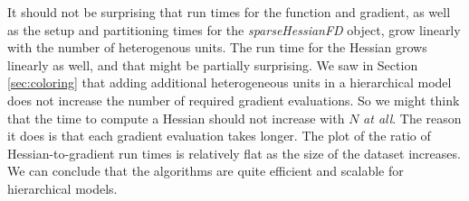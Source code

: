 \documentclass[article]{jss}\usepackage[]{graphicx}\usepackage[]{color}
\newcommand{\class}[1]{\textsl{#1}}
\begin{document}
It should not be surprising that run times
for the function and gradient, as well as the setup and
partitioning times for the \class{sparseHessianFD} object, grow
linearly with the number of heterogenous units.  The run time
for the Hessian grows linearly as well, and that might be partially
surprising.  We saw in Section \ref{sec:coloring} that adding
additional heterogeneous units in a hierarchical model does not
increase the number of required gradient evaluations.  So we might
think that the time
to compute a Hessian should not increase with $N$ \emph{at all}.  The
reason it does is that each gradient evaluation takes longer.  The
plot of the ratio of Hessian-to-gradient run times is relatively flat as the size
of the dataset increases.  We can conclude that the
 algorithms are quite efficient and scalable for
hierarchical models.





\FloatBarrier

\end{document}
